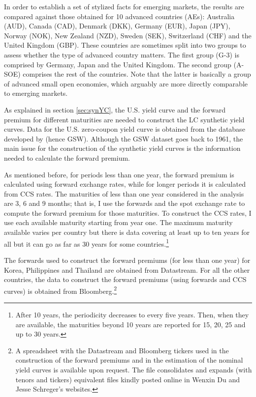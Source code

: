 {In order to establish a set of stylized facts for emerging markets, the results are compared against those obtained for 10 advanced countries (AEs): Australia (AUD), Canada (CAD), Denmark (DKK), Germany (EUR), Japan (JPY), Norway (NOK), New Zealand (NZD), Sweden (SEK), Switzerland (CHF) and the United Kingdom (GBP). These countries are sometimes split into two groups to assess whether the type of advanced country matters. The first group (G-3) is comprised by Germany, Japan and the United Kingdom. The second group (A-SOE) comprises the rest of the countries. Note that the latter is basically a group of advanced small open economies, which arguably are more directly comparable to emerging markets.

As explained in section \ref{sec:synYC}, the U.S. yield curve and the forward premium for different maturities are needed to construct the LC synthetic yield curves. Data for the U.S. zero-coupon yield curve is obtained from the database developed by \citet*{GSW:2007} (hence GSW). Although the GSW dataset goes back to 1961, the main issue for the construction of the synthetic yield curves is the information needed to calculate the forward premium. 

As mentioned before, for periods less than one year, the forward premium is calculated using forward exchange rates, while for longer periods it is calculated from CCS rates. The maturities of less than one year considered in the analysis are 3, 6 and 9 months; that is, I use the forwards and the spot exchange rate to compute the forward premium for those maturities. To construct the CCS rates, I use each available maturity starting from year one. The maximum maturity available varies per country but there is data covering at least up to ten years for all but it can go as far as 30 years for some countries.\footnote{After 10 years, the periodicity decreases to every five years. Then, when they are available, the maturities beyond 10 years are reported for 15, 20, 25 and up to 30 years.} %

The forwards used to construct the forward premiums (for less than one year) for Korea, Philippines and Thailand are obtained from Datastream. For all the other countries, the data to construct the forward premiums (using forwards and CCS curves) is obtained from Bloomberg.\footnote{A spreadsheet with the Datastream and Bloomberg tickers used in the construction of the forward premiums and in the estimation of the nominal yield curves is available upon request. The file consolidates and expands (with tenors and tickers) equivalent files kindly posted online in Wenxin Du and Jesse Schreger's websites.}

}
